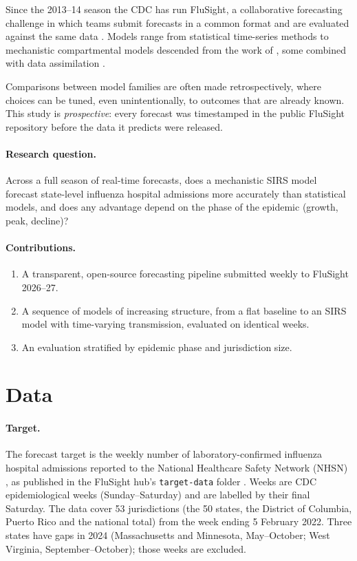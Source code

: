 \documentclass[11pt]{article}
\begin{document}
Since the 2013--14 season the CDC has run FluSight, a collaborative forecasting
challenge in which teams submit forecasts in a common format and are evaluated against
the same data \citep{reich2019, mathis2024}. Models range from statistical time-series
methods to mechanistic compartmental models descended from the work of
\citet{kermack1927}, some combined with data assimilation \citep{shaman2012}.

Comparisons between model families are often made retrospectively, where choices can be
tuned, even unintentionally, to outcomes that are already known. This study is
\emph{prospective}: every forecast was timestamped in the public FluSight repository
before the data it predicts were released.

\paragraph{Research question.}
Across a full season of real-time forecasts, does a mechanistic SIRS model forecast
state-level influenza hospital admissions more accurately than statistical models, and
does any advantage depend on the phase of the epidemic (growth, peak, decline)?

\paragraph{Contributions.}
\begin{enumerate}[nosep]
  \item A transparent, open-source forecasting pipeline submitted weekly to FluSight
        2026--27.
  \item A sequence of models of increasing structure, from a flat baseline to an SIRS
        model with time-varying transmission, evaluated on identical weeks.
  \item An evaluation stratified by epidemic phase and jurisdiction size.
\end{enumerate}

\section{Data}
\label{sec:data}

\paragraph{Target.} The forecast target is the weekly number of laboratory-confirmed
influenza hospital admissions reported to the National Healthcare Safety Network
(NHSN) \citep{nhsn2026}, as published in the FluSight hub's \texttt{target-data}
folder \citep{flusighthub2026}. Weeks are CDC epidemiological weeks (Sunday--Saturday)
and are labelled by their final Saturday. The data cover 53 jurisdictions (the 50
states, the District of Columbia, Puerto Rico and the national total) from the week
ending 5 February 2022. Three states have gaps in 2024 (Massachusetts and Minnesota,
May--October; West Virginia, September--October); those weeks are excluded.
\end{document}
